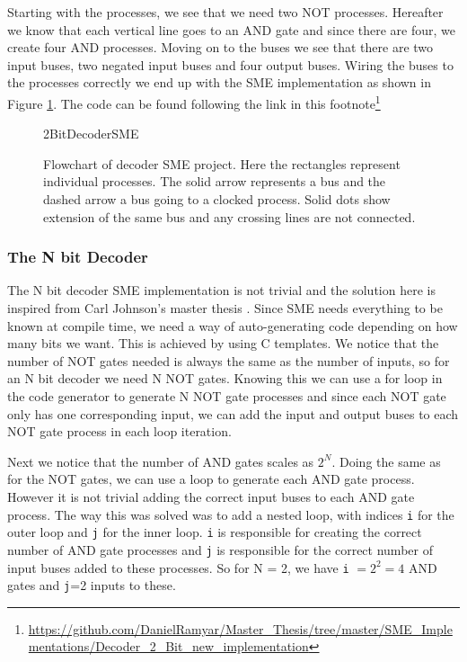         Starting with the processes, we see that we need two NOT processes. Hereafter we know that each vertical line goes to an AND gate and since there are four, we create four AND processes. Moving on to the buses we see that there are two input buses, two negated input buses and four output buses. Wiring the buses to the processes correctly we end up with the SME implementation as shown in Figure \ref{fig:2BitDecoderSME}. The code can be found following the link in this footnote\footnote{\url{https://github.com/DanielRamyar/Master_Thesis/tree/master/SME_Implementations/Decoder_2_Bit_new_implementation}}
        \begin{figure}[h!]
            \centering
            {2BitDecoderSME}
            \caption{Flowchart of decoder SME project. Here the rectangles represent individual processes. The solid arrow represents a bus and the dashed arrow a bus going to a clocked process. Solid dots show extension of the same bus and any crossing lines are not connected.}
            \label{fig:2BitDecoderSME}
        \end{figure}
        
        \subsubsection{The N bit Decoder}
            The N bit decoder SME implementation is not trivial and the solution here is inspired from Carl Johnson's master thesis \cite{CarlSpeciale}. Since SME needs everything to be known at compile time, we need a way of auto-generating code depending on how many bits we want. This is achieved by using C templates. We notice that the number of NOT gates needed is always the same as the number of inputs, so for an N bit decoder we need N NOT gates.
            Knowing this we can use a for loop in the code generator to generate N NOT gate processes and since each NOT gate only has one corresponding input, we can add the input and output buses to each NOT gate process in each loop iteration. 
            
            Next we notice that the number of AND gates scales as $2^{N}$. Doing the same as for the NOT gates, we can use a loop to generate each AND gate process. However it is not trivial adding the correct input buses to each AND gate process. The way this was solved was to add a nested loop, with indices \texttt{i} for the outer loop and \texttt{j} for the inner loop. \texttt{i} is responsible for creating the correct number of AND gate processes and \texttt{j} is responsible for the correct number of input buses added to these processes. So for N = 2, we have \texttt{i} $=2^{2}=4$ AND gates and \texttt{j}=2 inputs to these.
            
